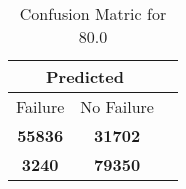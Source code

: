 \begin{table}[] 
\caption{Confusion Matric for 80.0} 
\label{Table: Prediction Accuracy-DMD80.0OnlySunEKF-ignoreReflection20.9EKF-top2-Reflection} 
\centering 
\begin{tabular} 
 {@{}ccc@{}} 
\toprule 
\multicolumn{2}{c}{\textbf{Predicted}}
 \\ \midrule 
\multicolumn{1}{|c|}{Failure} & 
\multicolumn{1}{c|}{No Failure}
 \\ \midrule 
\multicolumn{1}{|c|}{\color{green}\textbf{55836}} & 
\multicolumn{1}{c|}{\color{red}\textbf{31702}}
 \\ \midrule 
\multicolumn{1}{|c|}{\color{red}\textbf{3240}} & 
\multicolumn{1}{c|}{\color{green}\textbf{79350}}
 \\ \bottomrule 
\end{tabular} 
\end{table} 
